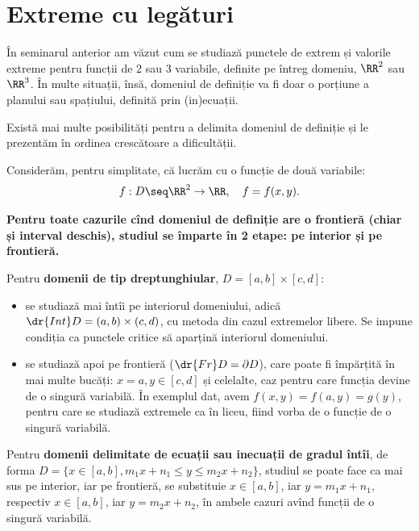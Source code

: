 \chapter{Extreme cu legături}


În seminarul anterior am văzut cum se studiază punctele de extrem
și valorile extreme pentru funcții de 2 sau 3 variabile, definite
pe întreg domeniu, $ \RR^2 $ sau $ \RR^3 $. În multe situații, însă,
domeniul de definiție va fi doar o porțiune a planului sau spațiului,
definită prin (in)ecuații.

Există mai multe posibilități pentru a delimita domeniul de definiție
și le prezentăm în ordinea crescătoare a dificultății.

Considerăm, pentru simplitate, că lucrăm cu o funcție de două variabile:
\[
  f : D \seq \RR^2 \to \RR, \quad f = f(x, y).
\]

\textbf{Pentru toate cazurile cînd domeniul de definiție are o frontieră
  (chiar și interval deschis), studiul se împarte în 2 etape: pe interior
  și pe frontieră.}

Pentru \textbf{domenii de tip dreptunghiular}, $ D = [a, b] \times [c, d] $:
\begin{itemize}
\item se studiază mai întîi pe interiorul domeniului, adică
  $ \dr{Int} D = (a, b) \times (c, d) $, cu metoda din cazul extremelor libere.
  Se impune condiția ca punctele critice să aparțină interiorul domeniului.
\item se studiază apoi pe frontieră ($\dr{Fr}D = \partial D $), care poate fi 
  împărțită în mai multe bucăți: $ x = a, y \in [c, d] $ și celelalte,
  caz pentru care funcția devine de o singură variabilă. În exemplul dat,
  avem $ f(x, y) = f(a, y) = g(y) $, pentru care se studiază extremele
  ca în liceu, fiind vorba de o funcție de o singură variabilă.
\end{itemize}

Pentru \textbf{domenii delimitate de ecuații sau inecuații de gradul întîi}, de
forma $ D = \{ x \in [a, b], m_1 x + n_1 \leq y \leq m_2 x + n_2 \} $, 
studiul se poate face ca mai sus pe interior, iar pe frontieră, se substituie
$ x \in [a, b] $, iar $ y = m_1 x + n_1 $, respectiv $ x \in [a, b] $,
iar $ y = m_2 x + n_2 $, în ambele cazuri avînd funcții de o singură variabilă.

